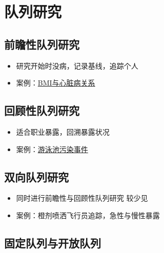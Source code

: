 \documentclass[
]{book}
\providecommand{\tightlist}{%
  \setlength{\itemsep}{0pt}\setlength{\parskip}{0pt}}
\begin{document}
\hypertarget{ux961fux5217ux7814ux7a76}{%
\section{队列研究}\label{ux961fux5217ux7814ux7a76}}

\hypertarget{ux524dux77bbux6027ux961fux5217ux7814ux7a76}{%
\subsection{前瞻性队列研究}\label{ux524dux77bbux6027ux961fux5217ux7814ux7a76}}

\begin{itemize}
\tightlist
\item
  研究开始时没病，记录基线，追踪个人
\item
  案例：\href{http://www.ncbi.nlm.nih.gov/pubmed/7654270}{BMI与心脏病关系}
\end{itemize}

\hypertarget{ux56deux987eux6027ux961fux5217ux7814ux7a76}{%
\subsection{回顾性队列研究}\label{ux56deux987eux6027ux961fux5217ux7814ux7a76}}

\begin{itemize}
\tightlist
\item
  适合职业暴露，回溯暴露状况
\item
  案例：\href{http://www.cdc.gov/parasites/giardia/}{游泳池污染事件}
\end{itemize}

\hypertarget{ux53ccux5411ux961fux5217ux7814ux7a76}{%
\subsection{双向队列研究}\label{ux53ccux5411ux961fux5217ux7814ux7a76}}

\begin{itemize}
\tightlist
\item
  同时进行前瞻性与回顾性队列研究 较少见
\item
  案例：橙剂喷洒飞行员追踪，急性与慢性暴露
\end{itemize}

\hypertarget{ux56faux5b9aux961fux5217ux4e0eux5f00ux653eux961fux5217}{%
\subsection{固定队列与开放队列}\label{ux56faux5b9aux961fux5217ux4e0eux5f00ux653eux961fux5217}}
\end{document}

